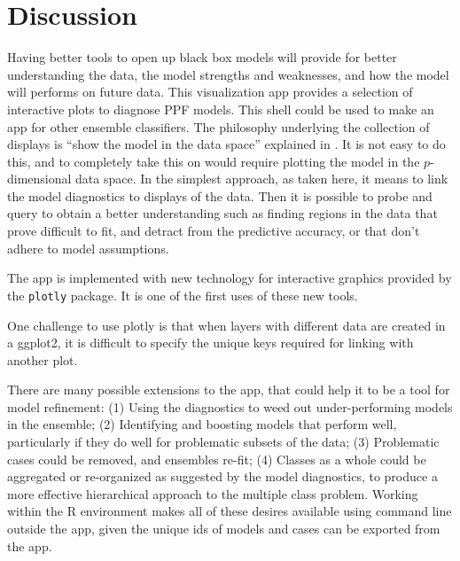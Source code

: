 \documentclass[10pt, legalpaper, twoside]{article}\usepackage[]{graphicx}\usepackage[]{color}
\begin{document}

\section{Discussion}\label{fur}

Having better tools to open up black box models will provide for better understanding the data, the model strengths and weaknesses, and how the model will performs on future data. This visualization app provides a selection of interactive plots to diagnose PPF models. This shell could be used to make an app for other ensemble classifiers. The philosophy underlying the collection of displays is ``show the model in the data space''  explained in \cite{wickham2015visualizing}. It is not easy to do this, and to completely take this on would require plotting the model in the $p$-dimensional data space. In the simplest approach, as taken here, it means to link the model diagnostics to displays of the data. Then it is possible to probe and query to obtain a better understanding such as finding regions in the data that prove difficult to fit, and detract from the predictive accuracy, or that don't adhere to model assumptions.

The app is implemented with new technology for interactive graphics provided by the \texttt{plotly} package. It is one of the first uses of these new tools.

One challenge to use plotly is that  when layers with different data are created in a ggplot2,  it is difficult to  specify the unique keys required for linking with another plot.

There are many possible extensions to the app, that could help it to be a tool for model refinement: (1) Using the diagnostics to weed out under-performing models in the ensemble; (2) Identifying and boosting models that perform well, particularly if they do well for problematic subsets of the data; (3) Problematic cases could be removed, and ensembles re-fit; (4) Classes as a whole could be aggregated or re-organized as suggested by the model diagnostics, to produce a more effective hierarchical approach to the multiple class problem. Working within the R environment makes all of these desires available using command line outside the app, given the unique ids of models and cases can be exported from the app.
\end{document}
